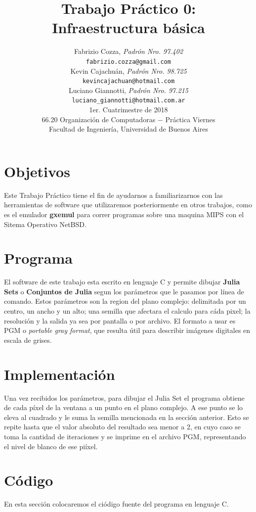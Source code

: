 \documentclass[a4paper,10pt]{article}
\title{		\textbf{Trabajo Pr\'{a}ctico 0: \\
			Infraestructura b\'{a}sica
			}}
\author{	Fabrizio Cozza, \textit{Padr\'{o}n Nro. 97.402}                     \\
            \texttt{ fabrizio.cozza@gmail.com }                                              \\[2.5ex]
            Kevin Cajachu\'{a}n, \textit{Padr\'{o}n Nro. 98.725}                     \\
            \texttt{ kevincajachuan@hotmail.com }                                              \\[2.5ex]
            Luciano Giannotti, \textit{Padr\'{o}n Nro. 97.215}                     \\
            \texttt{luciano\_giannotti@hotmail.com.ar}                                              \\[3.5ex]
	 \newline
            \normalsize{1er. Cuatrimestre de 2018}                                      \\
            \normalsize{66.20 Organizaci\'{o}n de Computadoras  $-$ Pr\'{a}ctica Viernes}  \\
            \normalsize{Facultad de Ingenier\'{i}a, Universidad de Buenos Aires}            \\
       }
\date{}
\begin{document}
\maketitle
\thispagestyle{empty}   %
\newpage

\section{Objetivos}

Este Trabajo Pr\'{a}ctico tiene el fin de ayudarnos a familiarizarnos con las herramientas de software que utilizaremos posteriormente en otros trabajos, como es el emulador \textbf{gxemul} para correr programas sobre una maquina MIPS con el Sitema Operativo NetBSD.


\section{Programa}

El software de este trabajo esta escrito en lenguaje C y permite dibujar \textbf{Julia Sets} o \textbf{Conjuntos de Julia} segun los par\'{a}metros que le pasamos por l\'{i}nea de comando.
Estos parámetros son la region del plano complejo: delimitada por un centro, un ancho y un alto; una semilla que afectara el calculo para c\'{a}da pixel; la resoluci\'{o}n y la salida ya sea por pantalla o por archivo.
El formato a usar es  PGM o \textit{portable gray format}, que resulta \'{u}til para describir im\'{a}genes digitales en escala de grises.


\section{Implementaci\'{o}n}

Una vez recibidos los par\'{a}metros, para dibujar el Julia Set el programa obtiene de cada p\'{i}xel de la ventana a un punto en el plano complejo.
A ese punto se lo eleva al cuadrado y le suma la semilla mencionada en la secci\'{o}n anterior. Esto se repite hasta que el valor absoluto del resultado sea menor a 2, en cuyo caso se toma la cantidad de iteraciones y se imprime en el archivo PGM, representando el nivel de blanco de ese pi\'{i}xel.


\section{C\'{o}digo}

En esta secci\'{o}n colocaremos el ci\'{o}digo fuente del programa en lenguaje C.
\end{document}
